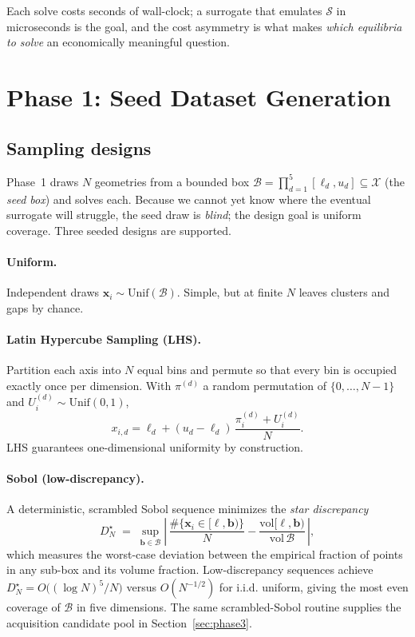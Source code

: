 \documentclass[11pt]{article}
\newcommand{\x}{\bm{x}}
\newcommand{\X}{\mathcal{X}}
\begin{document}
Each solve costs seconds of wall-clock; a surrogate that emulates
$\mathcal{S}$ in microseconds is the goal, and the cost asymmetry is what
makes \emph{which equilibria to solve} an economically meaningful question.

\section{Phase 1: Seed Dataset Generation}
\label{sec:phase1}

\subsection{Sampling designs}

Phase~1 draws $N$ geometries from a bounded box
$\mathcal{B} = \prod_{d=1}^5 [\ell_d, u_d] \subseteq \X$ (the \emph{seed box})
and solves each. Because we cannot yet know where the eventual surrogate will
struggle, the seed draw is \emph{blind}; the design goal is uniform coverage.
Three seeded designs are supported.

\paragraph{Uniform.} Independent draws $\x_i \sim \mathrm{Unif}(\mathcal{B})$.
Simple, but at finite $N$ leaves clusters and gaps by chance.

\paragraph{Latin Hypercube Sampling (LHS).} Partition each axis into $N$ equal
bins and permute so that every bin is occupied exactly once per dimension.
With $\pi^{(d)}$ a random permutation of $\{0,\dots,N-1\}$ and
$U^{(d)}_i \sim \mathrm{Unif}(0,1)$,
\begin{equation}
  x_{i,d} = \ell_d + (u_d-\ell_d)\,\frac{\pi^{(d)}_i + U^{(d)}_i}{N}.
\end{equation}
LHS guarantees one-dimensional uniformity by construction.

\paragraph{Sobol (low-discrepancy).} A deterministic, scrambled Sobol sequence
minimizes the \emph{star discrepancy}
\begin{equation}
  D^{\star}_N \;=\; \sup_{\bm{b}\in\mathcal{B}}
  \left|\,\frac{\#\{\x_i \in [\ell,\bm{b})\}}{N}
  - \frac{\mathrm{vol}[\ell,\bm{b})}{\mathrm{vol}\,\mathcal{B}}\,\right|,
\end{equation}
which measures the worst-case deviation between the empirical fraction of
points in any sub-box and its volume fraction. Low-discrepancy sequences
achieve $D^\star_N = O\!\big((\log N)^5/N\big)$ versus $O(N^{-1/2})$ for i.i.d.
uniform, giving the most even coverage of $\mathcal{B}$ in five dimensions.
The same scrambled-Sobol routine supplies the acquisition candidate pool in
Section~\ref{sec:phase3}.
\end{document}
